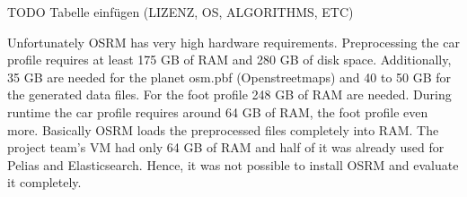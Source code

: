 TODO Tabelle einfügen (LIZENZ, OS, ALGORITHMS, ETC)






Unfortunately OSRM has very high hardware requirements\citep{J.2017}. Preprocessing the car profile requires at least 175 GB of RAM and 280 GB of disk space. Additionally, 35 GB are needed for the planet osm.pbf (Openstreetmaps) and 40 to 50 GB for the generated data files. For the foot profile 248 GB of RAM are needed. During runtime the car profile requires around 64 GB of RAM, the foot profile even more. Basically OSRM loads the preprocessed files completely into RAM\citep{J.2017}. The project team's VM had only 64 GB of RAM and half of it was already used for Pelias and Elasticsearch. Hence, it was not possible to install OSRM and evaluate it completely.

